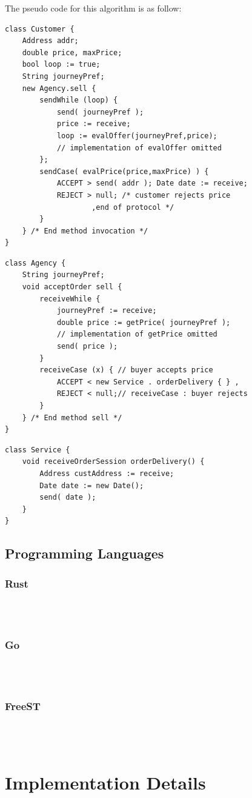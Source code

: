 \documentclass[runningheads]{llncs}
\begin{document}
The pseudo code for this algorithm is as follow:
\begin{lstlisting}[caption={Customer Algorithm},captionpos=b]
class Customer {
	Address addr;
	double price, maxPrice;
	bool loop := true;
	String journeyPref;
	new Agency.sell {
		sendWhile (loop) {
			send( journeyPref );
			price := receive;
			loop := evalOffer(journeyPref,price);
			// implementation of evalOffer omitted
		};
		sendCase( evalPrice(price,maxPrice) ) {
			ACCEPT > send( addr ); Date date := receive;
			REJECT > null; /* customer rejects price
					,end of protocol */ 
		}
	} /* End method invocation */
}
\end{lstlisting}
\begin{lstlisting}[caption={Agency Algorithm},captionpos=b]
class Agency {
	String journeyPref;
	void acceptOrder sell {
		receiveWhile {
			journeyPref := receive;
			double price := getPrice( journeyPref );
			// implementation of getPrice omitted
			send( price );
		}
		receiveCase (x) { // buyer accepts price
			ACCEPT < new Service . orderDelivery { } ,
			REJECT < null;// receiveCase : buyer rejects 
        }
	} /* End method sell */
}
\end{lstlisting}
\begin{lstlisting}[caption={Service Algorithm},captionpos=b]
class Service {
	void receiveOrderSession orderDelivery() {
		Address custAddress := receive;
		Date date := new Date();
		send( date );
	}
}
\end{lstlisting}
\subsection{Programming Languages}
\subsubsection{Rust}\hfill\\\\
\subsubsection{Go}\hfill\\\\
\subsubsection{FreeST}\hfill\\\\
\lipsum[1]
\section{Implementation Details}
\lipsum[1]
\end{document}
